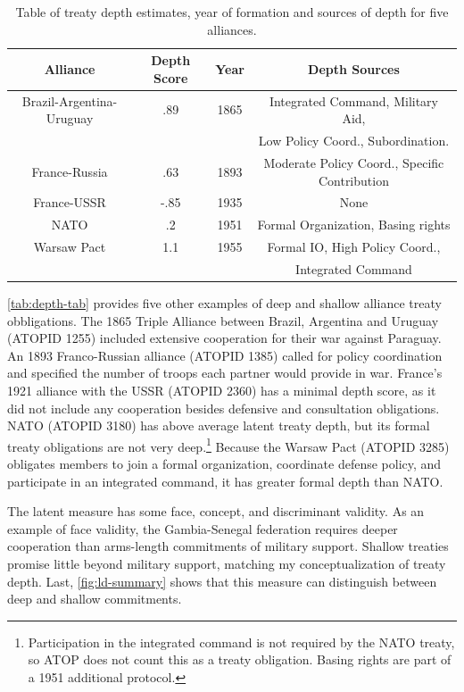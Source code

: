 \documentclass[12pt]{article}
\begin{document}
\begin{table}[hbt!]
\begin{center}
\begin{tabular}{cccc}
   Alliance  & Depth Score & Year & Depth Sources  \\
\hline
Brazil-Argentina-Uruguay & .89 & 1865 & Integrated Command, Military Aid, \\
                         &      &      &  Low Policy Coord., Subordination. \\
France-Russia   & .63 & 1893 & Moderate Policy Coord., Specific Contribution \\
 France-USSR   & -.85  & 1935  & None\\
 NATO & .2 & 1951 & Formal Organization, Basing rights \\ 
 Warsaw Pact & 1.1  & 1955 &  Formal IO, High Policy Coord., \\
             &      &      & Integrated Command  \\ 
\hline
\end{tabular}
\caption{Table of treaty depth estimates, year of formation and sources of depth for five alliances. }
\label{tab:depth-tab}
\end{center} 
\end{table}


\autoref{tab:depth-tab} provides five other examples of deep and shallow alliance treaty obbligations.  
The 1865 Triple Alliance between Brazil, Argentina and Uruguay (ATOPID 1255) included extensive cooperation for their war against Paraguay. 
An 1893 Franco-Russian alliance (ATOPID 1385) called for policy coordination and specified the number of troops each partner would provide in war. 
France's 1921 alliance with the USSR (ATOPID 2360) has a minimal depth score, as it did not include any cooperation besides defensive and consultation obligations. 
NATO (ATOPID 3180) has above average latent treaty depth, but its formal treaty obligations are not very deep.\footnote{Participation in the integrated command is not required by the NATO treaty, so ATOP does not count this as a treaty obligation. Basing rights are part of a 1951 additional protocol.}
Because the Warsaw Pact (ATOPID 3285) obligates members to join a formal organization, coordinate defense policy, and participate in an integrated command, it has greater formal depth than NATO. 


The latent measure has some face, concept, and discriminant validity. 
As an example of face validity, the Gambia-Senegal federation requires deeper cooperation than arms-length commitments of military support. 
Shallow treaties promise little beyond military support, matching my conceptualization of treaty depth. 
Last, \autoref{fig:ld-summary} shows that this measure can distinguish between deep and shallow commitments. 
\end{document}
